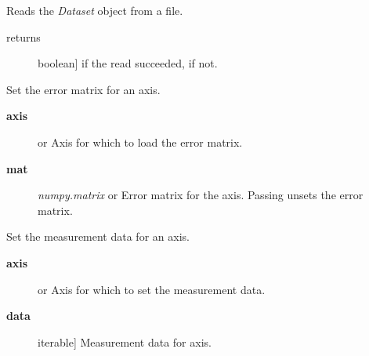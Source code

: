 \documentclass[a4paper,10pt,english]{sphinxmanual}
\begin{document}
\begin{fulllineitems}

\begin{fulllineitems}
\label{index:kafe.dataset.Dataset.read_from_file}
Reads the \emph{Dataset} object from a file.
\begin{description}
\item[{returns}] \leavevmode{[}boolean{]}
 if the read succeeded,  if not.

\end{description}

\end{fulllineitems}


\begin{fulllineitems}
\label{index:kafe.dataset.Dataset.set_cov_mat}
Set the error matrix for an axis.
\begin{description}
\item[{\textbf{axis}}] \leavevmode{[} or \code{'y'}{]}
Axis for which to load the error matrix.

\item[{\textbf{mat}}] \leavevmode{[}\emph{numpy.matrix} or \code{None}{]}
Error matrix for the axis. Passing  unsets the error
matrix.

\end{description}

\end{fulllineitems}


\begin{fulllineitems}
\label{index:kafe.dataset.Dataset.set_data}
Set the measurement data for an axis.
\begin{description}
\item[{\textbf{axis}}] \leavevmode{[} or \code{'y'}{]}
Axis for which to set the measurement data.

\item[{\textbf{data}}] \leavevmode{[}iterable{]}
Measurement data for axis.

\end{description}

\end{fulllineitems}


\end{fulllineitems}
\end{document}
